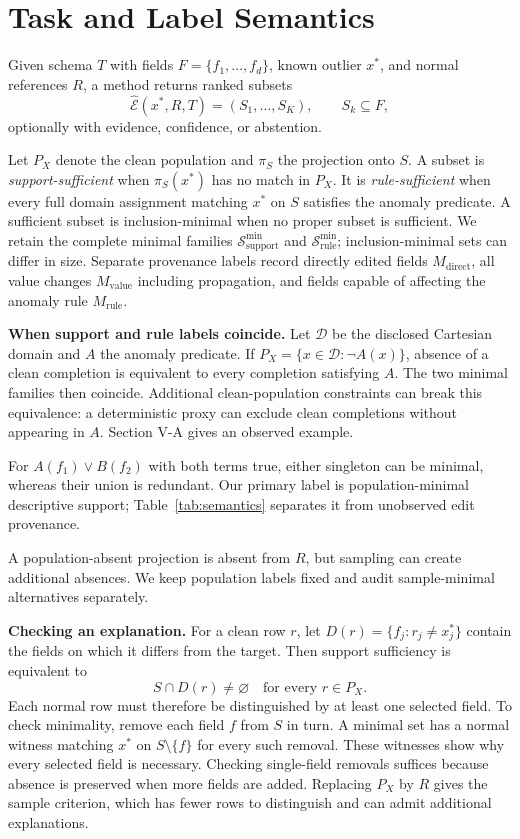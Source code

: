 \documentclass[conference]{IEEEtran}
\begin{document}
\section{Task and Label Semantics}

Given schema $T$ with fields $F=\{f_1,\ldots,f_d\}$, known outlier $x^*$, and normal references $R$, a method returns ranked subsets
\[
\widehat{\mathcal E}(x^*,R,T)=(S_1,\ldots,S_K),\qquad S_k\subseteq F,
\]
optionally with evidence, confidence, or abstention.

Let $P_X$ denote the clean population and $\pi_S$ the projection onto $S$. A subset is \emph{support-sufficient} when $\pi_S(x^*)$ has no match in $P_X$. It is \emph{rule-sufficient} when every full domain assignment matching $x^*$ on $S$ satisfies the anomaly predicate. A sufficient subset is inclusion-minimal when no proper subset is sufficient. We retain the complete minimal families $\mathcal S_{\mathrm{support}}^{\min}$ and $\mathcal S_{\mathrm{rule}}^{\min}$; inclusion-minimal sets can differ in size. Separate provenance labels record directly edited fields $M_{\mathrm{direct}}$, all value changes $M_{\mathrm{value}}$ including propagation, and fields capable of affecting the anomaly rule $M_{\mathrm{rule}}$.

\textbf{When support and rule labels coincide.} Let $\mathcal D$ be the disclosed Cartesian domain and $A$ the anomaly predicate. If $P_X=\{x\in\mathcal D:\neg A(x)\}$, absence of a clean completion is equivalent to every completion satisfying $A$. The two minimal families then coincide. Additional clean-population constraints can break this equivalence: a deterministic proxy can exclude clean completions without appearing in $A$. Section V-A gives an observed example.

For $A(f_1)\lor B(f_2)$ with both terms true, either singleton can be minimal, whereas their union is redundant. Our primary label is population-minimal descriptive support; Table~\ref{tab:semantics} separates it from unobserved edit provenance.

A population-absent projection is absent from $R$, but sampling can create additional absences. We keep population labels fixed and audit sample-minimal alternatives separately.

\textbf{Checking an explanation.} For a clean row $r$, let $D(r)=\{f_j:r_j\ne x^*_j\}$ contain the fields on which it differs from the target. Then support sufficiency is equivalent to
\[
  S\cap D(r)\ne\varnothing\quad\text{for every }r\in P_X.
\]
Each normal row must therefore be distinguished by at least one selected field. To check minimality, remove each field $f$ from $S$ in turn. A minimal set has a normal witness matching $x^*$ on $S\setminus\{f\}$ for every such removal. These witnesses show why every selected field is necessary. Checking single-field removals suffices because absence is preserved when more fields are added. Replacing $P_X$ by $R$ gives the sample criterion, which has fewer rows to distinguish and can admit additional explanations.
\end{document}

